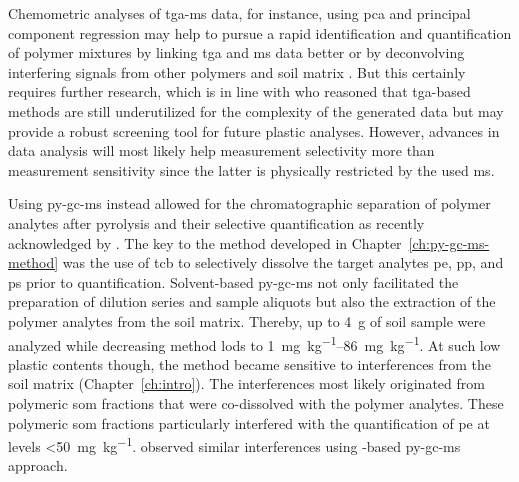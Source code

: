 Chemometric analyses of \ac{tga-ms} data, for instance, using \ac{pca} and principal component regression may help to pursue a rapid identification and quantification of polymer mixtures by linking \ac{tga} and \ac{ms} data better or by deconvolving interfering signals from other polymers and soil matrix \citep{DavidIntroducing2019}. But this certainly requires further research, which is in line with \citet{MansaThermogravimetric2021} who reasoned that \ac{tga}-based methods are still underutilized for the complexity of the generated data but may provide a robust screening tool for future plastic analyses. However, advances in data analysis will most likely help measurement selectivity more than measurement sensitivity since the latter is physically restricted by the used \ac{ms}.

Using \ac{py-gc-ms} instead allowed for the chromatographic separation of polymer analytes after pyrolysis and their selective quantification as recently acknowledged by \citet{Jimenez-SkrzypekCurrent2021}. The key to the method developed in Chapter~\ref{ch:py-gc-ms-method} was the use of \ac{tcb} to selectively dissolve the target analytes \ac{pe}, \ac{pp}, and \ac{ps} prior to quantification. Solvent-based \ac{py-gc-ms} not only facilitated the preparation of dilution series and sample aliquots but also the extraction of the polymer analytes from the soil matrix. Thereby, up to \SI{4}{\gram} of soil sample were analyzed while decreasing method \acp{lod} to \SIrange{1}{86}{\milli\gram\per\kilo\gram}.
At such low plastic contents though, the method became sensitive to interferences from the soil matrix (Chapter~\ref{ch:intro}). The interferences most likely originated from polymeric \ac{som} fractions that were co-dissolved with the polymer analytes. These polymeric \ac{som} fractions particularly interfered with the quantification of \ac{pe} at levels \SI{<50}{\milli\gram\per\kilo\gram}.  observed similar interferences using -based \ac{py-gc-ms} approach.

